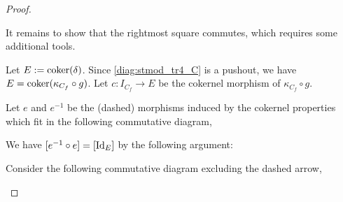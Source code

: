\begin{proof}
\begin{enumerate}[label={(\bfseries TR\arabic*)}]
{            It remains to show that the rightmost square commutes, which requires some additional tools.

            Let \( E := \operatorname{coker}(\delta)\). Since \autoref{diag:stmod_tr4_C} is a pushout, we have \( E = \operatorname{coker}(\kappa_{C_f} \circ g) \). Let \( c: I_{C_f} \to E \) be the cokernel morphism of \( \kappa_{C_f} \circ g \).

            Let \( e \) and \( e^{-1} \) be the (dashed) morphisms induced by the cokernel properties which fit in the following commutative diagram,
            \begin{center}
            \end{center}
            
            We have \( [e^{-1} \circ e] = [\operatorname{Id}_E] \) by the following argument:
            
            Consider the following commutative diagram excluding the dashed arrow,
            \begin{center}
\end{center}}
\end{enumerate}
\end{proof}
